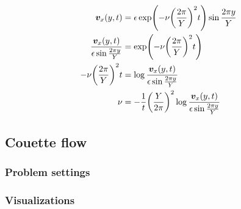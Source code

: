 \begin{equation}
  \begin{aligned}
    \boldsymbol{v}_x(y, t) & = \epsilon \exp
    \Biggl(
    -\nu
    \biggl(
      \frac{2\pi}{Y}
      \biggr)^2 t
    \Biggr) 
    \sin 
      \frac{2\pi y}{Y} \\
    \frac{\boldsymbol{v}_x(y, t)}{
      \epsilon
      \sin  \frac{2\pi y}{Y}
    } & =  \exp
    \Biggl(
    -\nu
    \biggl(
      \frac{2\pi}{Y}
      \biggr)^2 t
    \Biggr) \\
    -\nu
    \biggl(
      \frac{2\pi}{Y}
      \biggr)^2 t
      &= 
    \log \frac{\boldsymbol{v}_x(y, t)}{
      \epsilon
      \sin  \frac{2\pi y}{Y}
    } \\
    \nu
      &=
      - \frac{1}{t}
      \biggl(
        \frac{Y}{2\pi}
        \biggr)^2 
    \log \frac{\boldsymbol{v}_x(y, t)}{
      \epsilon
      \sin  \frac{2\pi y}{Y}
    } \\
  \end{aligned}
\end{equation}

\subsection{Couette flow}

\subsubsection{Problem settings}

\subsubsection{Visualizations}

